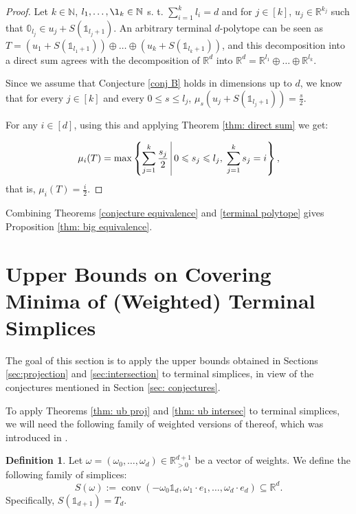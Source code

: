 \documentclass{amsart}
\theoremstyle{definition}
\newtheorem{definition}[theorem]{Definition}
\theoremstyle{remark}
\newcommand{\R}{\mathbb{R}}
\newcommand{\N}{\mathbb{N}}
\begin{document}
\begin{proof}
Let $k\in \N$, $l_1,\dots,\l_k\in \N$ s. t. $\sum\limits_{i=1}^k l_i=d$ and for $j\in[k]$, $u_j\in \R^{k_j}$ such that $\mathbb{0}_{l_j}\in u_j+S(\mathbb{1}_{l_j+1})$. An arbitrary terminal $d$-polytope can be seen as $T=(u_1+S(\mathbb{1}_{l_1+1}))\oplus\dots\oplus(u_k+S(\mathbb{1}_{l_k+1}))$, and this decomposition into a direct sum agrees with the decomposition of $\R^d$ into $\R^d=\R^{l_1}\oplus\dots\oplus\R^{l_k}$.

Since we assume that Conjecture \ref{conj B} holds in dimensions up to $d$, we know that for every $j\in [k]$ and every $0\leqslant s\leqslant l_j$, $\mu_s(u_j+S(\mathbb{1}_{l_j+1}))=\frac{s}{2}$.

For any $i\in [d]$, using this and applying Theorem \ref{thm: direct sum} we get:

$$\mu_i(T)=\max\left\{\sum\limits_{j=1}^k \frac{s_j}{2} \;\vline\; 0\leqslant s_j\leqslant l_j,\; \sum\limits_{j=1}^k s_j=i\right\},$$
that is, $ \mu_i(T)=\frac{i}{2}$.

\end{proof}

Combining Theorems \ref{conjecture equivalence} and  \ref{terminal polytope} gives Proposition \ref{thm: big equivalence}.




\section{Upper Bounds on Covering Minima of (Weighted) Terminal Simplices}\label{sec:terminal}

The goal of this section is to apply the upper bounds obtained in Sections \ref{sec:projection} and \ref{sec:intersection} to terminal simplices, in view of the conjectures mentioned in Section \ref{sec: conjectures}. 

To apply Theorems \ref{thm: ub proj} and \ref{thm: ub intersec} to terminal simplices, we will need the following family of weighted versions of thereof, which was introduced in \cite{CodenottiSantosSchymura}.

\begin{definition}
Let $\omega=(\omega_0,\dots, \omega_d)\in \R^{d+1}_{> 0}$ be a vector of weights. We define the following family of simplices:
$$S(\omega):=\operatorname{conv}(-\omega_0 \mathbb{1}_d, \omega_1 \cdot e_1, \dots, \omega_d\cdot e_d)\subseteq \R^d.$$
Specifically,  $S(\mathbb{1}_{d+1})=T_d$.
\end{definition}
\end{document}
